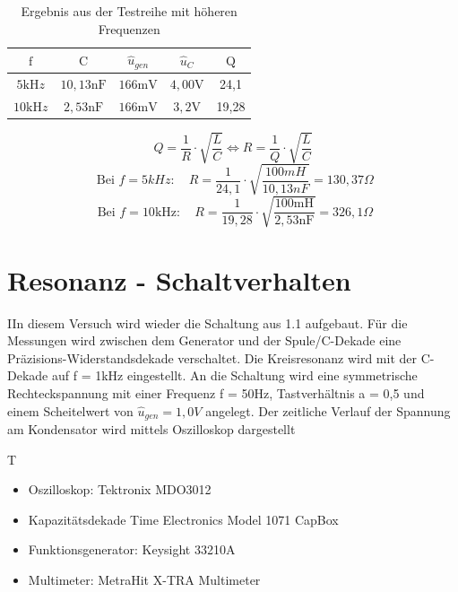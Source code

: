 \documentclass{article}
\begin{document}
\begin{table}[h]

  \begin{center}

    \begin{tabular}{|c|c|c|c|c|}
      \hline $\mathrm{f}$       & $\mathrm{C}$        & $\hat{u}_{g e n}$ & $\hat{u}_C$       & $\mathrm{Q}$ \\
      \hline $5 \mathrm{kH} z$  & $10,13 \mathrm{nF}$ & $166 \mathrm{mV}$ & $4,00 \mathrm{V}$ & 24,1         \\
      \hline $10 \mathrm{kH} z$ & $2,53 \mathrm{nF}$  & $166 \mathrm{mV}$ & $3,2 \mathrm{V}$  & 19,28        \\
      \hline
    \end{tabular}
    \caption{Ergebnis aus der Testreihe mit höheren Frequenzen}
    \label{tab:lCUQ}
  \end{center}
\end{table}
$$Q=\frac{1}{R} \cdot \sqrt{\frac{L}{C}} \Leftrightarrow R=\frac{1}{Q} \cdot \sqrt{\frac{L}{C}}$$
\begin{equation*}
  \text { Bei } f=5 k H z: \quad R=\frac{1}{24,1} \cdot \sqrt{\frac{100 m H}{10,13 n F}}=130,37 \Omega
\end{equation*}
\begin{equation*}
  \text { Bei } f=10 \mathrm{kHz}: \quad R=\frac{1}{19,28} \cdot \sqrt{\frac{100 \mathrm{mH}}{2,53 \mathrm{nF}}}=326,1 \Omega
\end{equation*}

\newpage
\section{Resonanz - Schaltverhalten}
\begin{task}
  IIn diesem Versuch wird wieder die Schaltung aus 1.1 aufgebaut. Für die Messungen wird zwischen dem Generator und der Spule/C-Dekade eine Präzisions-Widerstandsdekade verschaltet.
  Die Kreisresonanz wird mit der C-Dekade auf f = 1kHz eingestellt. An die Schaltung wird eine symmetrische Rechteckspannung mit einer Frequenz f = 50Hz, Tastverhältnis a = 0,5 und einem Scheitelwert von $\hat{u}_{gen} = 1,0 V$ angelegt.
  Der zeitliche Verlauf der Spannung am Kondensator wird mittels Oszilloskop dargestellt
\end{task}

\begin{devlist}
  T
  \begin{itemize}
    \item Oszilloskop: Tektronix MDO3012
    \item Kapazitätsdekade Time Electronics Model 1071 CapBox
    \item Funktionsgenerator: Keysight 33210A
    \item Multimeter: MetraHit X-TRA Multimeter
  \end{itemize}
\end{devlist}
\end{document}
